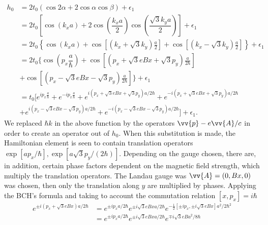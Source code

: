 \documentclass{report}
\newcommand{\f}[2]{\dfrac{#1}{#2}}
\begin{document}
\begin{equation}
	\begin{aligned}
		h_0
		 & = 2 t_0 \left(\cos2\alpha + 2\cos\alpha \cos\beta\right) + \epsilon_1                                                                                                                         \\
		 & = 2t_{0} \left[ \cos(k_x a) + 2 \cos \left(\f{k_x a}{2}\right) \cos \left(\f{\sqrt{3}k_y a}{2}\right) \right] + \epsilon_1                                                                    \\
		 & = 2t_{0} \left\{ \cos(k_x a) + \cos\left[\left( k_{x} + \sqrt{3} k_{y} \right)\frac{a}{2}\right] + \cos\left[\left( k_{x} - \sqrt{3} k_{y} \right)\frac{a}{2}\right]\right\} + \epsilon_1     \\
		 & = 2t_{0} \Biggl\{ \cos(p_{x}\f{a}{\hbar}) + \cos \left[\left(p_{x} + \sqrt{3} e B x + \sqrt{3} p_{y}\right)\frac{a}{2\hbar}\right]                                                            \\
		 & + \cos \left[\left(p_{x} - \sqrt{3} e B x - \sqrt{3} p_{y}\right)\frac{a}{2\hbar}\right] \Biggr\} + \epsilon_1                                                                                \\
		 & = t_{0} \biggl[e^{i p_{x}\frac{a}{\hbar}} + e^{-ip_{x}\frac{a}{\hbar}} + e^{i(p_{x} + \sqrt{3} eBx + \sqrt{3} p_{y} ) a / 2\hbar} + e^{-i(p_{x} + \sqrt{3} eBx + \sqrt{3} p_{y} ) a / 2\hbar} \\
		 & + e^{i(p_{x} - \sqrt{3} eBx - \sqrt{3} p_{y} ) a / 2\hbar} + e^{-i(p_{x} - \sqrt{3} eBx - \sqrt{3} p_{y} ) a / 2\hbar} \biggr] + \epsilon_1.
	\end{aligned}
\end{equation}
We replaced $\hbar k$ in the above function by the operators $\vv{p} - e \vv{A} / c$ in order to create an operator out of $h_{0}$. When this substitution is made, the Hamiltonian element is seen to contain translation operators $\exp[a p_{x} / \hbar],\exp[a \sqrt{3} p_{y} / (2\hbar)]$. Depending on the gauge chosen, there are, in addition, certain phase factors dependent on the magnetic field strength, which multiply the translation operators. The Landau gauge was $\vv{A} = (0,Bx,0)$ was chosen, then only the translation along $y$ are multiplied by phases. \cite{PhysRevB.14.2239}
Applying the BCH's formula and taking to account the commutation relation $\left[x,p_{x}\right] = i \hbar$
\begin{equation}
	\begin{aligned}
		e^{\pm i(p_{x} + \sqrt{3} e B x) a / 2\hbar}
		 & = e^{\pm i p_{x} a / 2 \hbar} e^{\pm i\sqrt{3} e B x a / 2 \hbar} e^{-\frac{1}{2} \left[\pm i p_{x}, \pm i \sqrt{3} e B x\right] a^{2} / 2 \hbar^{2}} \\
		 & = e^{\pm i p_{x} a / 2 \hbar} e^{\pm i\sqrt{3} e B x a / 2 \hbar} e^{\mp i \sqrt{3} e B a^{2} / 8 \hbar}
	\end{aligned}
\end{equation}
\end{document}
